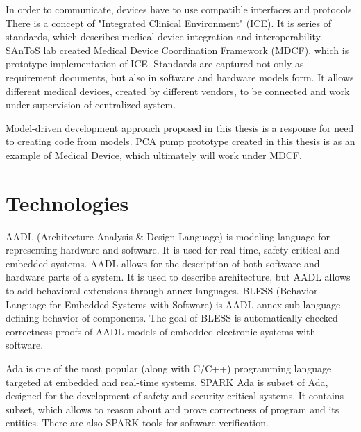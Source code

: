In order to communicate, devices have to use compatible interfaces and protocols. There is a concept of "Integrated Clinical Environment" (ICE). It is series of standards, which describes medical device integration and interoperability. SAnToS lab created Medical Device Coordination Framework (MDCF), which is prototype implementation of ICE. Standards are captured not only as requirement documents, but also in software and hardware models form. It allows different medical devices, created by different vendors, to be connected and work under supervision of centralized system.

Model-driven development approach proposed in this thesis is a response for need to creating code from models. PCA pump prototype created in this thesis is as an example of Medical Device, which ultimately will work under MDCF.


\section{Technologies}
\label{introduction:technologies}

AADL (Architecture Analysis \& Design Language) is modeling language for representing hardware and software. It is used for real-time, safety critical and embedded systems. AADL allows for the description of both software and hardware parts of a system. It is used to describe architecture, but AADL allows to add behavioral extensions through annex languages. BLESS (Behavior Language for Embedded Systems with Software) is AADL annex sub language defining behavior of components. The goal of BLESS is automatically-checked correctness proofs of AADL models of embedded electronic systems with software.

Ada is one of the most popular (along with C/C++) programming language targeted at embedded and real-time systems. SPARK Ada is subset of Ada, designed for the development of safety and security critical systems. It contains subset, which allows to reason about and prove correctness of program and its entities. There are also SPARK tools for software verification.

